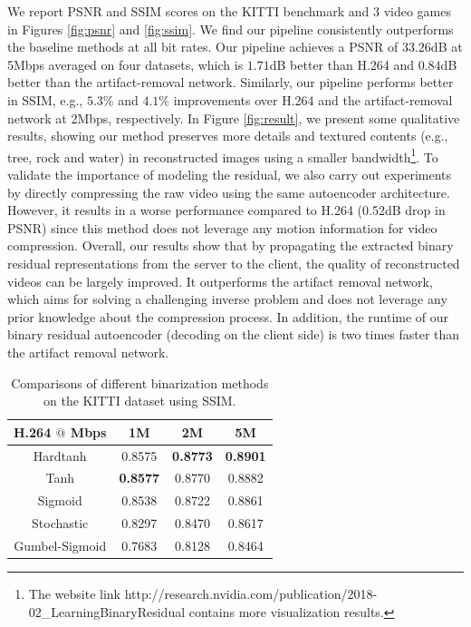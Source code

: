 \documentclass[letterpaper]{article} %
\begin{document}
We report PSNR and SSIM scores on the KITTI benchmark and 3 video games in Figures \ref{fig:psnr} and \ref{fig:ssim}. We find our pipeline consistently outperforms the baseline methods at all bit rates. Our pipeline achieves a PSNR of $33.26$dB at 5Mbps averaged on four datasets, which is $1.71$dB better than H.264 and $0.84$dB better than the artifact-removal network. Similarly, our pipeline performs better in SSIM, e.g., $5.3\%$ and $4.1\%$ improvements over H.264 and the artifact-removal network at 2Mbps, respectively. In Figure \ref{fig:result}, we present some qualitative results, showing our method preserves more details and textured contents (e.g., tree, rock and water) in reconstructed images using a smaller bandwidth\footnote{The website link http://research.nvidia.com/publication/2018-02\_Learning\-Binary\-Residual contains more visualization results.}.  To validate the importance of modeling the residual, we also carry out experiments by directly compressing the raw video using the same autoencoder architecture. However, it results in a worse performance compared to H.264 (0.52dB drop in PSNR) since this method does not leverage any motion information for video compression. 	Overall, our results show that by propagating the extracted binary residual representations from the server to the client, the quality of reconstructed videos can be largely improved. It outperforms the artifact removal network, which aims for solving a challenging inverse problem and does not leverage any prior knowledge about the compression process. In addition, the runtime of our binary residual autoencoder (decoding on the client side) is two times faster than the artifact removal network.

\begin{table}[t]
\caption{Comparisons of different binarization methods on the KITTI dataset using SSIM.
}
\centering
\begin{tabular}{cccc}
\toprule
H.264 $@$ Mbps & 1M & 2M & 5M \\
\hline

Hardtanh & 0.8575 & \textbf{0.8773} & \textbf{0.8901} \\
\hline

Tanh & \textbf{0.8577} & 0.8770 & 0.8882 \\
\hline

Sigmoid & 0.8538 & 0.8722 & 0.8861 \\
\hline

Stochastic & 0.8297 & 0.8470 & 0.8617 \\
\hline

Gumbel-Sigmoid & 0.7683 & 0.8128 & 0.8464 \\
\bottomrule
\end{tabular}
\label{tab:binary_ssim}
\end{table}
\end{document}
